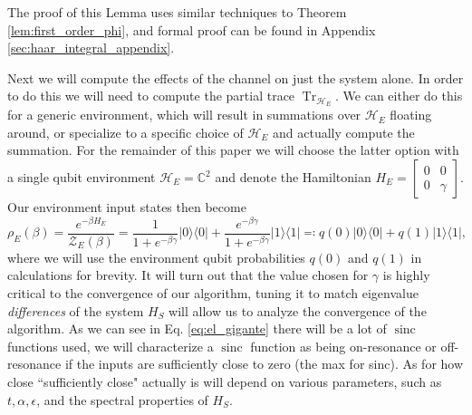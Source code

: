 \documentclass{article}
\newcommand{\ketbra}[2]{| #1\rangle\! \langle #2|}
\DeclareMathOperator{\Tr}{Tr}
\newcommand{\hilb}{\mathcal{H}}
\newcommand{\partfun}{\mathcal{Z}}
\DeclareMathOperator{\sinc}{sinc}
\begin{document}
\noindent The proof of this Lemma uses similar techniques to Theorem \ref{lem:first_order_phi}, and formal proof can be found in Appendix \ref{sec:haar_integral_appendix}.

Next we will compute the effects of the channel on just the system alone. In order to do this we will need to compute the partial trace $\Tr_{\hilb_E}$. We can either do this for a generic environment, which will result in summations over $\hilb_E$ floating around, or specialize to a specific choice of $\hilb_E$ and actually compute the summation. For the remainder of this paper we will choose the latter option with a single qubit environment $\hilb_E = \mathbb{C}^2$ and denote the Hamiltonian $H_E = \begin{bmatrix} 0 & 0 \\ 0 & \gamma \end{bmatrix}$. Our environment input states then become
\begin{equation}
    \rho_E(\beta) = \frac{e^{-\beta H_E}}{\partfun_E(\beta)} = \frac{1}{1 + e^{-\beta \gamma}} \ketbra{0}{0} + \frac{e^{-\beta \gamma}}{1 + e^{-\beta \gamma}} \ketbra{1}{1} \eqqcolon q(0) \ketbra{0}{0} + q(1) \ketbra{1}{1} \label{eq:env_state_def},
\end{equation}
where we will use the environment qubit probabilities $q(0)$ and $q(1)$ in calculations for brevity. It will turn out that the value chosen for $\gamma$ is highly critical to the convergence of our algorithm, tuning it to match eigenvalue \emph{differences} of the system $H_S$ will allow us to analyze the convergence of the algorithm. As we can see in Eq. \eqref{eq:el_gigante} there will be a lot of $\sinc$ functions used, we will characterize a $\sinc$ function as being on-resonance or off-resonance if the inputs are sufficiently close to zero (the max for sinc). As for how close ``sufficiently close" actually is will depend on various parameters, such as $t, \alpha, \epsilon$, and the spectral properties of $H_S$.  
\end{document}
